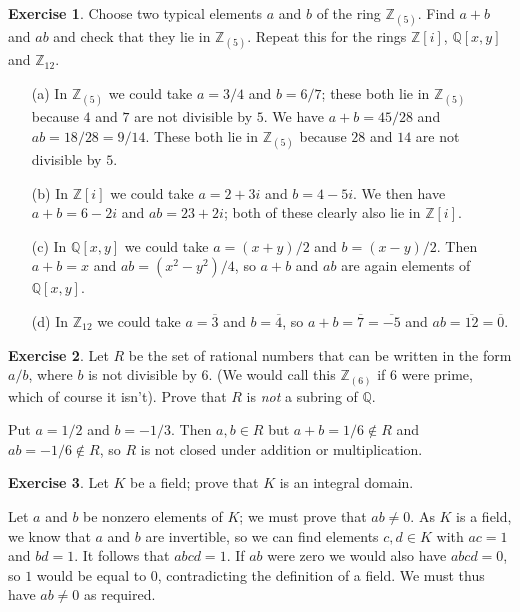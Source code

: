 \documentclass{amsart}
\newcommand{\Q}         {{\mathbb{Q}}}
\newcommand{\Z}         {{\mathbb{Z}}}
\newcommand{\ov}[1]     {\overline{#1}}
\newcommand{\ip}[1]     {\langle #1\rangle}
\renewcommand{\:}{\colon}
\theoremstyle{definition}
\newtheorem{exercise}{Exercise}[section]
\renewenvironment{solution}{\SolutionAtEnd}{\endSolutionAtEnd}
\begin{document}
\begin{exercise}
 Choose two typical elements $a$ and $b$ of the ring $\Z_{(5)}$.  Find
 $a+b$ and $ab$ and check that they lie in $\Z_{(5)}$.  Repeat this
 for the rings $\Z[i]$, $\Q[x,y]$ and $\Z_{12}$.
\end{exercise}
\begin{solution}
 \begin{itemize}
 \item[(a)] In $\Z_{(5)}$ we could take $a=3/4$ and $b=6/7$; these
  both lie in $\Z_{(5)}$ because $4$ and $7$ are not divisible by $5$.
  We have $a+b=45/28$ and $ab=18/28=9/14$.  These both lie in
  $\Z_{(5)}$ because $28$ and $14$ are not divisible by $5$.
 \item[(b)] In $\Z[i]$ we could take $a=2+3i$ and $b=4-5i$.  We then
  have $a+b=6-2i$ and $ab=23+2i$; both of these clearly also lie in
  $\Z[i]$.
 \item[(c)] In $\Q[x,y]$ we could take $a=(x+y)/2$ and $b=(x-y)/2$.
  Then $a+b=x$ and $ab=(x^2-y^2)/4$, so $a+b$ and $ab$ are again
  elements of $\Q[x,y]$.
 \item[(d)] In $\Z_{12}$ we could take $a=\ov{3}$ and $b=\ov{4}$, so
  $a+b=\ov{7}=\ov{-5}$ and $ab=\ov{12}=\ov{0}$. 
 \end{itemize}
\end{solution}

\begin{exercise}
 Let $R$ be the set of rational numbers that can be written in the
 form $a/b$, where $b$ is not divisible by $6$.  (We would call this
 $\Z_{(6)}$ if $6$ were prime, which of course it isn't).  Prove that
 $R$ is \emph{not} a subring of $\Q$.
\end{exercise}
\begin{solution}
 Put $a=1/2$ and $b=-1/3$.  Then $a,b\in R$ but $a+b=1/6\not\in R$ and
 $ab=-1/6\not\in R$, so $R$ is not closed under addition or
 multiplication. 
\end{solution}

\begin{exercise}
 Let $K$ be a field; prove that $K$ is an integral domain.
\end{exercise}
\begin{solution}
 Let $a$ and $b$ be nonzero elements of $K$; we must prove that
 $ab\neq 0$.  As $K$ is a field, we know that $a$ and $b$ are
 invertible, so we can find elements $c,d\in K$ with $ac=1$ and
 $bd=1$.  It follows that $abcd=1$.  If $ab$ were zero we would also
 have $abcd=0$, so $1$ would be equal to $0$, contradicting the
 definition of a field.  We must thus have $ab\neq 0$ as required.
\end{solution}
\end{document}
